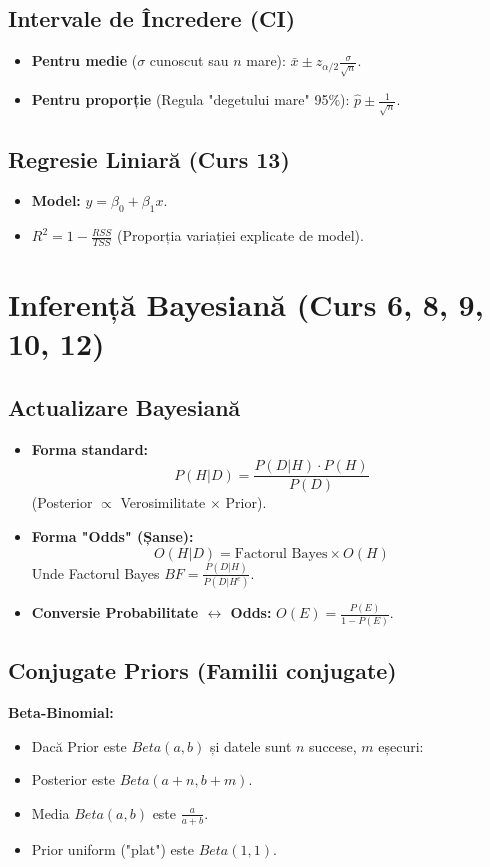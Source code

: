 \documentclass[12pt, a4paper]{article}
\begin{document}
\subsection*{Intervale de Încredere (CI)}
\begin{itemize}
    \item \textbf{Pentru medie} ($\sigma$ cunoscut sau $n$ mare): $\bar{x} \pm z_{\alpha/2} \frac{\sigma}{\sqrt{n}}$.
    \item \textbf{Pentru proporție} (Regula "degetului mare" 95\%): $\hat{p} \pm \frac{1}{\sqrt{n}}$.
\end{itemize}

\subsection*{Regresie Liniară (Curs 13)}
\begin{itemize}
    \item \textbf{Model:} $y = \beta_0 + \beta_1 x$.
    \item $R^2 = 1 - \frac{RSS}{TSS}$ (Proporția variației explicate de model).
\end{itemize}

\hrulefill

\section{Inferență Bayesiană (Curs 6, 8, 9, 10, 12)}

\subsection*{Actualizare Bayesiană}
\begin{itemize}
    \item \textbf{Forma standard:}
    \[ P(H|D) = \frac{P(D|H) \cdot P(H)}{P(D)} \]
    (Posterior $\propto$ Verosimilitate $\times$ Prior).
    
    \item \textbf{Forma "Odds" (Șanse):}
    \[ O(H|D) = \text{Factorul Bayes} \times O(H) \]
    Unde Factorul Bayes $BF = \frac{P(D|H)}{P(D|H^c)}$.
    \item \textbf{Conversie Probabilitate $\leftrightarrow$ Odds:} $O(E) = \frac{P(E)}{1-P(E)}$.
\end{itemize}

\subsection*{Conjugate Priors (Familii conjugate)}
\textbf{Beta-Binomial:}
\begin{itemize}
    \item Dacă Prior este $Beta(a, b)$ și datele sunt $n$ succese, $m$ eșecuri:
    \item Posterior este $Beta(a+n, b+m)$.
    \item Media $Beta(a,b)$ este $\frac{a}{a+b}$.
    \item Prior uniform ("plat") este $Beta(1,1)$.
\end{itemize}
\end{document}

